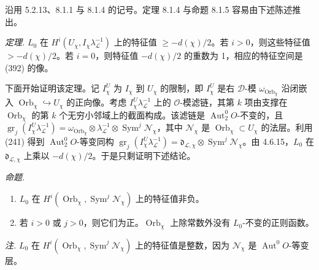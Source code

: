 



沿用 5.2.13、8.1.1 与 8.1.4 的记号。定理 8.1.4 与命题 8.1.5 容易由下述陈述推出。

 \emph{定理.} $L_0$ 在 $H^{i}(U_{\chi},I_{\chi}\lambda_{\mathcal{L}}^{-1})$ 上的特征值 $\ge -d(\chi)/2$。若 $i>0$，则这些特征值 $>-d(\chi)/2$。若 $i=0$，则特征值 $-d(\chi)/2$ 的重数为 1，相应的特征空间是 (392) 的像。

下面开始证明该定理。记 $I^{U}_{\chi}$ 为 $I_{\chi}$ 到 $U_{\chi}$ 的限制，即 $I^{U}_{\chi}$ 是右 $\mathcal{D}$-模 $\omega_{\operatorname{Orb}_{\chi}}$ 沿闭嵌入 $\operatorname{Orb}_{\chi}\hookrightarrow U_{\chi}$ 的正向像。考虑 $I^{U}_{\chi}\lambda_{\mathcal{L}}^{-1}$ 上的 $\mathcal{O}$-模滤链，其第 $k$ 项由支撑在 $\operatorname{Orb}_{\chi}$ 的第 $k$ 个无穷小邻域上的截面构成。该滤链是 $\operatorname{Aut}^{0}_{2}O$-不变的，且 $\operatorname{gr}_{j}(I^{U}_{\chi}\lambda_{\mathcal{L}}^{-1})=\omega_{\operatorname{Orb}_{\chi}}\otimes\lambda_{\mathcal{L}}^{-1}\otimes\operatorname{Sym}^{j}\mathcal{N}_{\chi}$，其中 $\mathcal{N}_{\chi}$ 是 $\operatorname{Orb}_{\chi}\subset U_{\chi}$ 的法层。利用 (241) 得到 $\operatorname{Aut}^{0}_{2}O$-等变同构 $\operatorname{gr}_{j}(I^{U}_{\chi}\lambda_{\mathcal{L}}^{-1})=\mathfrak{d}_{\mathcal{L},\chi}\otimes\operatorname{Sym}^{j}\mathcal{N}_{\chi}$。由 4.6.15，$L_0$ 在 $\mathfrak{d}_{\mathcal{L},\chi}$ 上乘以 $-d(\chi)/2$。于是只剩证明下述结论。

 \emph{命题.}
\begin{enumerate}[label=\roman*),leftmargin=2.2em]
\item $L_0$ 在 $H^{i}(\operatorname{Orb}_{\chi},\operatorname{Sym}^{j}\mathcal{N}_{\chi})$ 上的特征值非负。
\item 若 $i>0$ 或 $j>0$，则它们为正。$\operatorname{Orb}_{\chi}$ 上除常数外没有 $L_0$-不变的正则函数。
\end{enumerate}

\emph{注.} $L_0$ 在 $H^{i}(\operatorname{Orb}_{\chi},\operatorname{Sym}^{j}\mathcal{N}_{\chi})$ 上的特征值是整数，因为 $\mathcal{N}_{\chi}$ 是 $\operatorname{Aut}^{0}O$-等变层。

